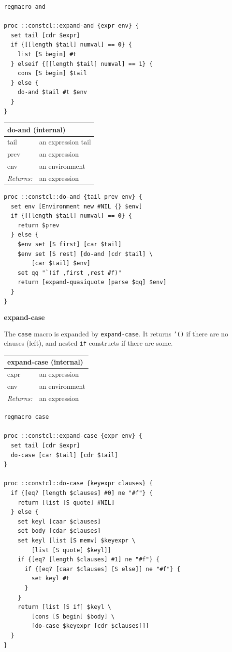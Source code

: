 \documentclass[twoside,9pt]{report}
\begin{document}
\noindent\makebox[\linewidth]{\rule{\linewidth}{0.4pt}}
\begin{lstlisting}
regmacro and
 
proc ::constcl::expand-and {expr env} {
  set tail [cdr $expr]
  if {[[length $tail] numval] == 0} {
    list [S begin] #t
  } elseif {[[length $tail] numval] == 1} {
    cons [S begin] $tail
  } else {
    do-and $tail #t $env
  }
}
\end{lstlisting}
\noindent\makebox[\linewidth]{\rule{\linewidth}{0.4pt}}
\begin{tabular}{ |l l| }
\hline
\multicolumn{2}{|l|}{do-and (internal)} \\
\hline
tail & an expression tail \\
prev & an expression \\
env & an environment \\
\textit{Returns:} & an expression \\
\hline
\end{tabular}

\noindent\makebox[\linewidth]{\rule{\linewidth}{0.4pt}}
\begin{lstlisting}
proc ::constcl::do-and {tail prev env} {
  set env [Environment new #NIL {} $env]
  if {[[length $tail] numval] == 0} {
    return $prev
  } else {
    $env set [S first] [car $tail]
    $env set [S rest] [do-and [cdr $tail] \
        [car $tail] $env]
    set qq "`(if ,first ,rest #f)"
    return [expand-quasiquote [parse $qq] $env]
  }
}
\end{lstlisting}
\noindent\makebox[\linewidth]{\rule{\linewidth}{0.4pt}}

\textbf{expand-case}


The \texttt{case} macro is expanded by \texttt{expand-case}. It returns \texttt{'()} if there are no clauses (left), and nested \texttt{if} constructs if there are some.

\begin{tabular}{ |l l| }
\hline
\multicolumn{2}{|l|}{expand-case (internal)} \\
\hline
expr & an expression \\
env & an environment \\
\textit{Returns:} & an expression \\
\hline
\end{tabular}

\noindent\makebox[\linewidth]{\rule{\linewidth}{0.4pt}}
\begin{lstlisting}
regmacro case
 
proc ::constcl::expand-case {expr env} {
  set tail [cdr $expr]
  do-case [car $tail] [cdr $tail]
}
 
proc ::constcl::do-case {keyexpr clauses} {
  if {[eq? [length $clauses] #0] ne "#f"} {
    return [list [S quote] #NIL]
  } else {
    set keyl [caar $clauses]
    set body [cdar $clauses]
    set keyl [list [S memv] $keyexpr \
        [list [S quote] $keyl]]
    if {[eq? [length $clauses] #1] ne "#f"} {
      if {[eq? [caar $clauses] [S else]] ne "#f"} {
        set keyl #t
      }
    }
    return [list [S if] $keyl \
        [cons [S begin] $body] \
        [do-case $keyexpr [cdr $clauses]]]
  }
}
\end{lstlisting}
\noindent\makebox[\linewidth]{\rule{\linewidth}{0.4pt}}
\end{document}
